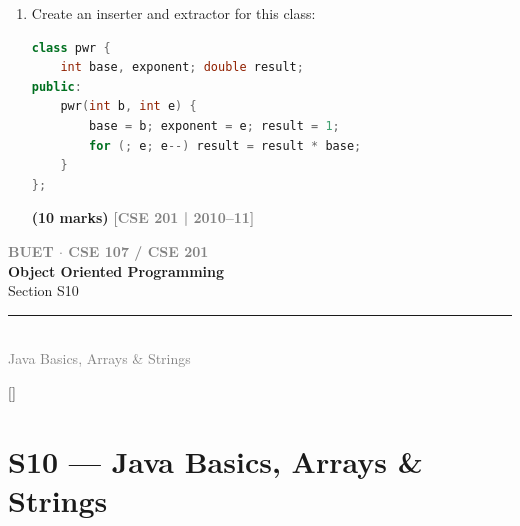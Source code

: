 \documentclass[12pt,a3paper]{article}
\newcommand{\yr}[1]{\hfill\textcolor{gray}{\small\textbf{[#1]}}}
\newcommand{\mk}[1]{\textcolor{orange!70!black}{\small\textbf{(#1 marks)}}}
\newcommand{\secdivider}[4]{%
  \newpage\thispagestyle{empty}%
  \vspace*{\fill}%
  \begin{tcolorbox}[enhanced,colback=#4!7,colframe=#3,boxrule=1.5pt,arc=8pt,
    left=20pt,right=20pt,top=22pt,bottom=22pt,
    shadow={3pt}{-3pt}{0pt}{black!15}]
    \centering
    {\large\textcolor{gray}{\textbf{BUET $\cdot$ CSE 107 / CSE 201}}}\\[8pt]
    {\fontsize{26}{32}\selectfont\bfseries\textcolor{#3}{Object Oriented Programming}}\\[6pt]
    {\fontsize{15}{19}\selectfont\textcolor{dgray}{#1}}\\[12pt]
    \textcolor{#3!60}{\rule{0.5\textwidth}{0.5pt}}\\[6pt]
    {\small\textcolor{gray}{#2}}
  \end{tcolorbox}%
  \vspace*{\fill}\newpage%
}
\begin{document}
\begin{enumerate}
\item Create an inserter and extractor for this class:
\begin{lstlisting}[language=C++]
class pwr {
    int base, exponent; double result;
public:
    pwr(int b, int e) {
        base = b; exponent = e; result = 1;
        for (; e; e--) result = result * base;
    }
};
\end{lstlisting}
\mk{10}
\yr{CSE 201 | 2010--11}





\end{enumerate}
\newpage

\secdivider{Section S10}{Java Basics, Arrays \& Strings}{cB}{cB}
\label{sec:S10}
\titleformat{\section}{\large\bfseries\color{cB}}{}{0em}{}[\titlerule]
\section{S10 --- Java Basics, Arrays \& Strings}
\end{document}
